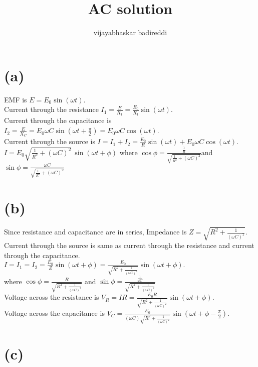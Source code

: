 \documentclass[12pt]{article}
\title{AC solution}
\author{vijayabhaskar badireddi}
\begin{document}
\section*{(a)}

EMF is \(E=E_0\sin{(\omega{t})}\).\\
Current through the resistance \(I_1=\frac{E}{R_1}=\frac{E_0}{R_1}\sin{(\omega{t})}\).\\
Current through the capacitance is \(I_2=\frac{E}{X_C}=E_0\omega{C}\sin{\left(\omega{t}+\frac{\pi}{2}\right)}=E_0\omega{C}\cos{\left(\omega{t}\right)}
\).\\
Current through the source is \(I=I_1+I_2=\frac{E_0}{R}\sin{\left(\omega{t}\right)}+E_0\omega{C}\cos{\left(\omega{t}\right)}
\).\\
\(I=E_0\sqrt{\frac{1}{R^2}+(\omega{C})^2}\,\sin{\left(\omega{t}+\phi\right)}\) where 
\(\cos{\phi}=\frac{\frac{1}{R}}{\sqrt{\frac{1}{R^2}+(\omega{C})^2}} \)and \(\sin{\phi}=\frac{\omega{C}}{\sqrt{\frac{1}{R^2}+(\omega{C})^2}}
\)\\

\section*{(b)}

Since resistance and capacitance are in series, Impedance is 
\(Z=\sqrt{R^2+\frac{1}{(\omega{C})^2}}. \)\\
Current through the source is same as current through the resistance and current through the capacitance.\\
\(I=I_1=I_2=\frac{E_0}{Z}\sin{\left(\omega{t}+\phi \right )}=\frac{E_0}{\sqrt{R^2+\frac{1}{(\omega{C})^2}}}\sin{\left(\omega{t}+\phi \right )}.\)\\
where \(\cos{\phi}=\frac{R}{\sqrt{R^2+\frac{1}{(\omega{C})^2}}}\) and \(\sin{\phi}=\frac{\frac{1}{\omega{C}}}{\sqrt{R^2+\frac{1}{(\omega{C})^2}}}\)\\
Voltage across the resistance is \(V_{R}=IR=\frac{E_0R}{\sqrt{R^2+\frac{1}{(\omega{C})^2}}}\sin{\left(\omega{t}+\phi \right )}.\)\\
Voltage across the capacitance is \(V_{C}=\frac{E_0}{(\omega{C})\sqrt{R^2+\frac{1}{(\omega{C})^2}}}\sin{\left(\omega{t}+\phi -\frac{\pi}{2}\right )}.\)\\

\section*{(c)}
\end{document}

